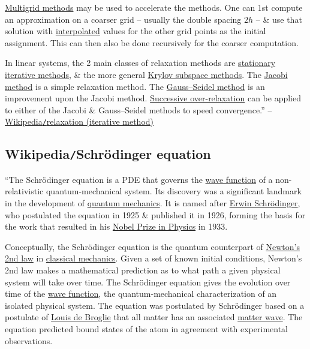\documentclass{article}
\begin{document}
\href{https://en.wikipedia.org/wiki/Multigrid_methods}{Multigrid methods} may be used to accelerate the methods. One can 1st compute an approximation on a coarser grid -- usually the double spacing $2h$ -- \& use that solution with \href{https://en.wikipedia.org/wiki/Interpolation}{interpolated} values for the other grid points as the initial assignment. This can then also be done recursively for the coarser computation.

In linear systems, the 2 main classes of relaxation methods are \href{https://en.wikipedia.org/wiki/Iterative_method#Stationary_iterative_methods}{stationary iterative methods}, \& the more general \href{https://en.wikipedia.org/wiki/Iterative_method#Krylov_subspace_methods}{Krylov subspace methods}. The \href{https://en.wikipedia.org/wiki/Jacobi_method}{Jacobi method} is a simple relaxation method. The \href{https://en.wikipedia.org/wiki/Gauss%E2%80%93Seidel_method}{Gauss--Seidel method} is an improvement upon the Jacobi method. \href{https://en.wikipedia.org/wiki/Successive_over-relaxation}{Successive over-relaxation} can be applied to either of the Jacobi \& Gauss--Seidel methods to speed convergence.'' -- \href{https://en.wikipedia.org/wiki/Relaxation_(iterative_method)}{Wikipedia{\tt/}relaxation (iterative method)}


\subsection{Wikipedia{\tt/}Schrödinger equation}
``The {\sc Schrödinger equation} is a PDE that governs the \href{https://en.wikipedia.org/wiki/Wave_function}{wave function} of a non-relativistic quantum-mechanical system. Its discovery was a significant landmark in the development of \href{https://en.wikipedia.org/wiki/Quantum_mechanics}{quantum mechanics}. It is named after \href{https://en.wikipedia.org/wiki/Erwin_Schr%C3%B6dinger}{\sc Erwin Schr\"odinger}, who postulated the equation in 1925 \& published it in 1926, forming the basis for the work that resulted in his \href{https://en.wikipedia.org/wiki/Nobel_Prize_in_Physics}{Nobel Prize in Physics} in 1933.

Conceptually, the Schrödinger equation is the quantum counterpart of \href{https://en.wikipedia.org/wiki/Newton%27s_second_law}{Newton's 2nd law} in \href{https://en.wikipedia.org/wiki/Classical_mechanics}{classical mechanics}. Given a set of known initial conditions, Newton's 2nd law makes a mathematical prediction as to what path a given physical system will take over time. The Schrödinger equation gives the evolution over time of the \href{https://en.wikipedia.org/wiki/Wave_function}{wave function}, the quantum-mechanical characterization of an isolated physical system. The equation was postulated by Schrödinger based on a postulate of \href{https://en.wikipedia.org/wiki/Louis_de_Broglie}{Louis de Broglie} that all matter has an associated \href{https://en.wikipedia.org/wiki/Matter_wave}{matter wave}. The equation predicted bound states of the atom in agreement with experimental observations.
\end{document}
